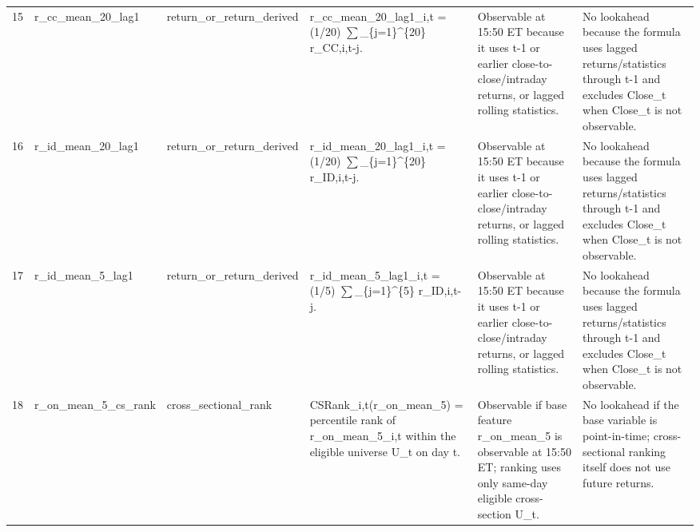 \begin{landscape}
\begin{longtable}{P{0.42cm} P{2.25cm} P{2.05cm} P{5.25cm} P{4.85cm} P{5.25cm}}
15 & r\_\allowbreak{}cc\_\allowbreak{}mean\_\allowbreak{}20\_\allowbreak{}lag1 & return\_\allowbreak{}or\_\allowbreak{}return\_\allowbreak{}derived & r\_\allowbreak{}cc\_\allowbreak{}mean\_\allowbreak{}20\_\allowbreak{}lag1\_\allowbreak{}i,t = (1/20) $\sum$\_\allowbreak{}\{j=1\}\textasciicircum{}\{20\} r\_\allowbreak{}CC,i,t-j. & Observable at 15:50 ET because it uses t-1 or earlier close-to-close/intraday returns, or lagged rolling statistics. & No lookahead because the formula uses lagged returns/statistics through t-1 and excludes Close\_\allowbreak{}t when Close\_\allowbreak{}t is not observable. \\
16 & r\_\allowbreak{}id\_\allowbreak{}mean\_\allowbreak{}20\_\allowbreak{}lag1 & return\_\allowbreak{}or\_\allowbreak{}return\_\allowbreak{}derived & r\_\allowbreak{}id\_\allowbreak{}mean\_\allowbreak{}20\_\allowbreak{}lag1\_\allowbreak{}i,t = (1/20) $\sum$\_\allowbreak{}\{j=1\}\textasciicircum{}\{20\} r\_\allowbreak{}ID,i,t-j. & Observable at 15:50 ET because it uses t-1 or earlier close-to-close/intraday returns, or lagged rolling statistics. & No lookahead because the formula uses lagged returns/statistics through t-1 and excludes Close\_\allowbreak{}t when Close\_\allowbreak{}t is not observable. \\
17 & r\_\allowbreak{}id\_\allowbreak{}mean\_\allowbreak{}5\_\allowbreak{}lag1 & return\_\allowbreak{}or\_\allowbreak{}return\_\allowbreak{}derived & r\_\allowbreak{}id\_\allowbreak{}mean\_\allowbreak{}5\_\allowbreak{}lag1\_\allowbreak{}i,t = (1/5) $\sum$\_\allowbreak{}\{j=1\}\textasciicircum{}\{5\} r\_\allowbreak{}ID,i,t-j. & Observable at 15:50 ET because it uses t-1 or earlier close-to-close/intraday returns, or lagged rolling statistics. & No lookahead because the formula uses lagged returns/statistics through t-1 and excludes Close\_\allowbreak{}t when Close\_\allowbreak{}t is not observable. \\
18 & r\_\allowbreak{}on\_\allowbreak{}mean\_\allowbreak{}5\_\allowbreak{}cs\_\allowbreak{}rank & cross\_\allowbreak{}sectional\_\allowbreak{}rank & CSRank\_\allowbreak{}i,t(r\_\allowbreak{}on\_\allowbreak{}mean\_\allowbreak{}5) = percentile rank of r\_\allowbreak{}on\_\allowbreak{}mean\_\allowbreak{}5\_\allowbreak{}i,t within the eligible universe U\_\allowbreak{}t on day t. & Observable if base feature r\_\allowbreak{}on\_\allowbreak{}mean\_\allowbreak{}5 is observable at 15:50 ET; ranking uses only same-day eligible cross-section U\_\allowbreak{}t. & No lookahead if the base variable is point-in-time; cross-sectional ranking itself does not use future returns. \\

\end{longtable}
\end{landscape}

